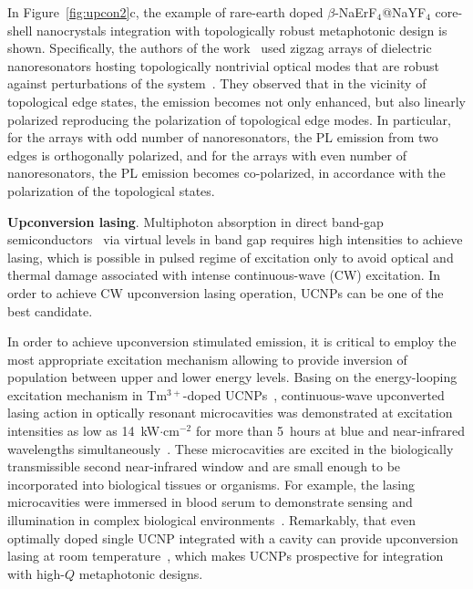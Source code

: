\documentclass[journal=chreay,manuscript=review]{achemso}
\begin{document}
In Figure~\ref{fig:upcon2}c, the example of rare-earth doped $\beta$-NaErF$_4$@NaYF$_4$ core-shell nanocrystals integration with topologically robust metaphotonic design is shown. 
 Specifically, the authors of the work~\cite{tripathi2021topological} used zigzag arrays of dielectric nanoresonators hosting topologically nontrivial optical modes that are robust against perturbations of the system~\cite{kruk2019nonlinear}. They observed that in the vicinity of topological edge states, the emission becomes not only enhanced, but also linearly polarized reproducing the polarization of topological edge modes. In particular, for the arrays with odd number of nanoresonators, the PL emission from two edges is orthogonally polarized, and for the arrays with even number of nanoresonators, the PL emission becomes co-polarized, in accordance with the polarization of the topological states. 

{\bf Upconversion lasing}. Multiphoton absorption in direct band-gap semiconductors~\cite{guzelturk2014amplified,li2015ultralow, zhou2021perovskites} via virtual levels in band gap requires high intensities to achieve lasing, which is possible in pulsed regime of excitation only to avoid optical and thermal damage associated with intense continuous-wave (CW) excitation. In order to achieve CW upconversion lasing operation, UCNPs can be one of the best candidate. 

In order to achieve upconversion stimulated emission, it is critical to employ the most appropriate excitation mechanism allowing to provide inversion of population between upper and lower energy levels. Basing on the energy-looping excitation mechanism in Tm$^{3+}$-doped UCNPs~\cite{levy2016energy}, continuous-wave upconverted lasing action in optically resonant microcavities was demonstrated at excitation intensities as low as 14~kW$\cdot$cm$^{-2}$ for more than 5~hours at blue and near-infrared wavelengths simultaneously~\cite{fernandez2018continuous}. These microcavities are excited in the biologically transmissible second near-infrared window and are small enough to be incorporated into biological tissues or organisms. For example, the lasing microcavities were immersed in blood serum to demonstrate sensing and illumination in complex biological environments~\cite{fernandez2018continuous}. Remarkably, that even optimally doped single UCNP integrated with a cavity can provide upconversion lasing at room temperature~\cite{shang2020low}, which makes UCNPs prospective for integration with high-$Q$ metaphotonic designs.
\end{document}
